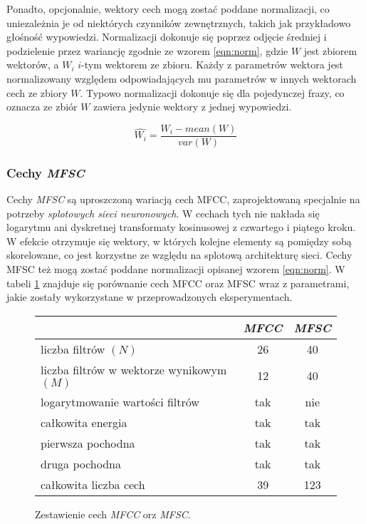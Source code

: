 \documentclass[11pt]{article}
\begin{document}
	Ponadto, opcjonalnie, wektory cech mogą zostać poddane normalizacji, co uniezależnia je od niektórych czynników zewnętrznych, takich jak przykładowo głośność wypowiedzi. Normalizacji dokonuje się poprzez odjęcie średniej i podzielenie przez wariancję zgodnie ze wzorem \ref{eqn:norm}, gdzie $W$ jest zbiorem wektorów, a $W_i$ $i$-tym wektorem ze zbioru. Każdy z parametrów wektora jest normalizowany względem odpowiadających mu parametrów w innych wektorach cech ze zbiory $W$. Typowo normalizacji dokonuje się dla pojedynczej frazy, co oznacza ze zbiór $W$ zawiera jedynie wektory z jednej wypowiedzi.
	
	\begin{equation}
		\hat{W_i} = \frac{W_i - mean(W)}{var(W)}
		\label{eqn:norm}
	\end{equation}

	\subsubsection{Cechy \textit{MFSC}}
	\label{sec:Feature_vec_mfsc}
	
	Cechy \textit{MFSC} są uproszczoną wariacją cech MFCC, zaprojektowaną specjalnie na potrzeby \textit{splotowych sieci neuronowych}. W cechach tych nie nakłada się logarytmu ani dyskretnej transformaty kosinusowej z czwartego i piątego kroku. W efekcie otrzymuje się wektory, w których kolejne elementy są pomiędzy sobą skorelowane, co jest korzystne ze względu na splotową architekturę sieci. Cechy MFSC też mogą zostać poddane normalizacji opisanej wzorem \ref{eqn:norm}. W tabeli \ref{fig:feature_comparision} znajduje się porównanie cech MFCC oraz MFSC wraz z parametrami, jakie zostały wykorzystane w przeprowadzonych eksperymentach.
	
	\begin{figure}
		\begin{center}
			\begin{tabular}{|l|c|c|}
				\hline
				                                          & \textit{MFCC} & \textit{MFSC} \\ 
                \hline
				liczba filtrów $(N)$                      &       26      &      40       \\
				liczba filtrów w wektorze wynikowym $(M)$ &       12      &      40       \\  
				logarytmowanie wartości filtrów           &       tak     &      nie      \\
				całkowita energia                         &       tak     &      tak      \\
				pierwsza pochodna                         &       tak     &      tak      \\
				druga pochodna                            &       tak     &      tak      \\
				całkowita liczba cech                     &       39      &      123      \\
				\hline
				
			\end{tabular}			
		\end{center}
		\label{fig:feature_comparision}
		\caption{Zestawienie cech \textit{MFCC} orz \textit{MFSC}.}
	\end{figure}
	
\end{document}
